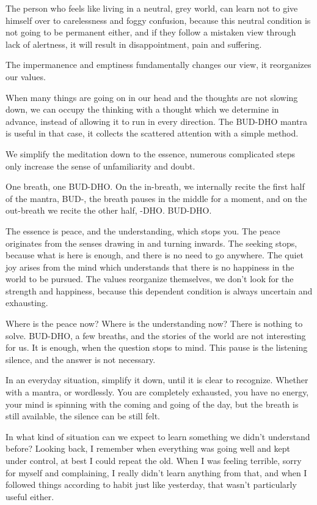 The person who feels like living in a neutral, grey world, can learn not
to give himself over to carelessness and foggy confusion, because this
neutral condition is not going to be permanent either, and if they
follow a mistaken view through lack of alertness, it will result in
disappointment, pain and suffering.

The impermanence and emptiness fundamentally changes our view, it
reorganizes our values.

When many things are going on in our head and the thoughts are not
slowing down, we can occupy the thinking with a thought which we
determine in advance, instead of allowing it to run in every direction.
The BUD-DHO mantra is useful in that case, it collects the scattered
attention with a simple method.

We simplify the meditation down to the essence, numerous complicated
steps only increase the sense of unfamiliarity and doubt.

One breath, one BUD-DHO. On the in-breath, we internally recite the
first half of the mantra, BUD-, the breath pauses in the middle for a
moment, and on the out-breath we recite the other half, -DHO. BUD-DHO.

The essence is peace, and the understanding, which stops you. The peace
originates from the senses drawing in and turning inwards. The seeking
stops, because what is here is enough, and there is no need to go
anywhere. The quiet joy arises from the mind which understands that
there is no happiness in the world to be pursued. The values reorganize
themselves, we don't look for the strength and happiness, because this
dependent condition is always uncertain and exhausting.

Where is the peace now? Where is the understanding now? There is nothing
to solve. BUD-DHO, a few breaths, and the stories of the world are not
interesting for us. It is enough, when the question stops to mind. This
pause is the listening silence, and the answer is not necessary.

In an everyday situation, simplify it down, until it is clear to
recognize. Whether with a mantra, or wordlessly. You are completely
exhausted, you have no energy, your mind is spinning with the coming and
going of the day, but the breath is still available, the silence can be
still felt.

In what kind of situation can we expect to learn something we didn't
understand before? Looking back, I remember when everything was going
well and kept under control, at best I could repeat the old. When I was
feeling terrible, sorry for myself and complaining, I really didn't
learn anything from that, and when I followed things according to habit
just like yesterday, that wasn't particularly useful either.

